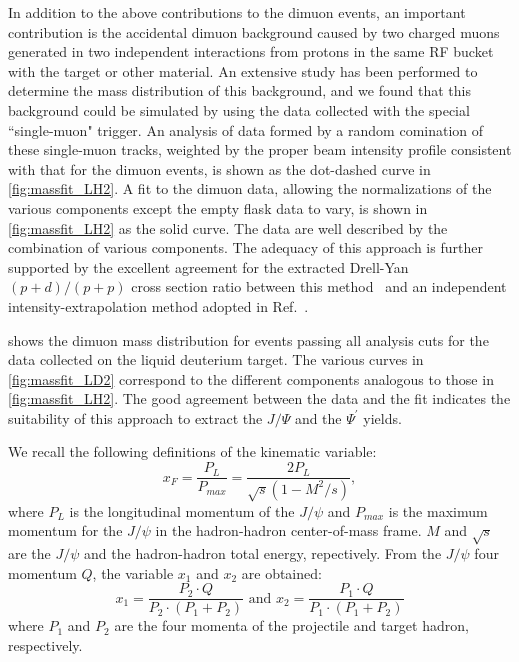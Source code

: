 \documentclass[reprint,aps,unsortedaddress,superscriptaddress,prd,floatfix,showpacs,linenumbers]{revtex4-2}
\begin{document}
In addition to the above contributions to the dimuon events, an important
contribution is the accidental dimuon background caused by two charged 
muons generated in two independent interactions from protons in the same 
RF bucket with the target or other material. An extensive
study has been performed to determine the mass distribution of this background,
and we found that this background could be simulated by using
the data collected with the special ``single-muon" trigger. An analysis
of data formed by a random 
comination of these single-muon tracks, weighted by the proper beam intensity
profile consistent with that for the dimuon events, is shown as the dot-dashed
curve in \cref{fig:massfit_LH2}. A fit to the dimuon data, allowing the normalizations of
the various components except the empty flask data to vary, is shown in \cref{fig:massfit_LH2}
as the solid curve. The data are well described by the combination of various
components. The adequacy of this approach is further supported by the excellent
agreement for the extracted Drell-Yan $(p+d) / (p+p)$ cross section ratio 
between this method~\cite{dove2023} and an independent intensity-extrapolation
method adopted in Ref.~\cite{dove2021}.

 shows the dimuon mass distribution for events passing all analysis
cuts for the data collected on the liquid deuterium target. The various curves
in \cref{fig:massfit_LD2} correspond to the different components analogous to those in \cref{fig:massfit_LH2}.
The good agreement between the data and the fit indicates the suitability of
this approach to extract the $J/\Psi$ and the $\Psi^\prime$ yields. 

We recall the following definitions of the kinematic variable:
\begin{equation}
	x_F = \frac{P_L}{P_{max}}=\frac{2P_L}{\sqrt{s}\left(1-M^2/s\right)},
\end{equation}
where $P_L$ is the longitudinal momentum of the $J/\psi$ and $P_{max}$ is
the maximum momentum for the $J/\psi$ in the hadron-hadron center-of-mass
frame. $M$ and $\sqrt{s}$ are the $J/\psi$ and the hadron-hadron total energy,
repectively. From the $J/\psi$ four momentum $Q$, the variable $x_1$ and $x_2$
are obtained:
\begin{equation}
	x_1=\frac{P_2\cdot Q}{P_2 \cdot \left(P_1 + P_2\right)} \textrm{ and } x_2=\frac{P_1\cdot Q}{P_1 \cdot \left(P_1 + P_2\right)} 
\end{equation}
where $P_1$ and $P_2$ are the four momenta of the projectile and target hadron,
respectively.
\end{document}
